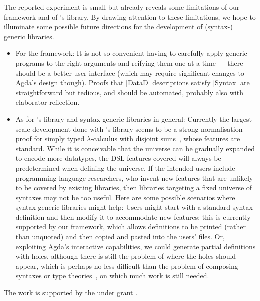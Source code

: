 \documentclass[sigplan,review,fleqn]{acmart}
\renewcommand{\verb}{\collectverb{\color{AgdaFunction}}}
\begin{document}

The reported experiment is small but already reveals some limitations of our framework and of \citeauthor{Allais-generic-syntax}'s library.
By drawing attention to these limitations, we hope to illuminate some possible future directions for the development of (syntax-) generic libraries.
\begin{itemize}[leftmargin=*]
\item For the framework:
It is not so convenient having to carefully apply generic programs to the right arguments and reifying them one at a time --- there should be a better user interface (which may require significant changes to Agda's design though).
Proofs that \verb|DataD| descriptions satisfy \verb|Syntax| are straightforward but tedious, and should be automated, probably also with elaborator reflection.
\item As for \citeauthor{Allais-generic-syntax}'s library and syntax-generic libraries in general:
Currently the largest-scale development done with \citeauthor{Allais-generic-syntax}'s library seems to be a strong normalisation proof for simply typed $\lambda$-calculus with disjoint sums~\citep[Section~4.3]{Abel-POPLMark-reloaded}, whose features are standard.
While it is conceivable that the universe can be gradually expanded to encode more datatypes, the DSL features covered will always be predetermined when defining the universe.
If the intended users include programming language researchers, who invent new features that are unlikely to be covered by existing libraries, then libraries targeting a fixed universe of syntaxes may not be too useful.
Here are some possible scenarios where syntax-generic libraries might help:
Users might start with a standard syntax definition and then modify it to accommodate new features; this is currently supported by our framework, which allows definitions to be printed (rather than unquoted) and then copied and pasted into the users' files.
Or, exploiting Agda's interactive capabilities, we could generate partial definitions with holes,  although there is still the problem of where the holes should appear, which is perhaps no less difficult than the problem of composing syntaxes or type theories~\citep{Delaware-meta-theory-a-la-carte,Forster-Coq-a-la-carte}, on which much work is still needed.
\end{itemize}

\begin{acks}
The work is supported by the  under grant .
\end{acks}



%
\end{document}

